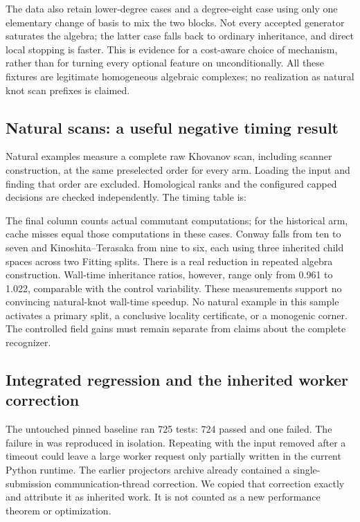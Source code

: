 The data also retain lower-degree cases and a degree-eight case using only
one elementary change of basis to mix the two blocks. Not every accepted generator saturates the algebra; the latter case
falls back to ordinary inheritance, and direct local stopping is faster.
This is evidence for a cost-aware choice of mechanism, rather than for
turning every optional feature on unconditionally. All these fixtures are
legitimate homogeneous algebraic complexes; no realization as natural knot
scan prefixes is claimed.

\subsection{Natural scans: a useful negative timing result}

Natural examples measure a complete raw Khovanov scan, including scanner
construction, at the same preselected order for every arm. Loading the
input and finding that order are excluded. Homological ranks and the
configured capped decisions are checked independently. The timing table is:



The final column counts actual commutant computations; for the historical
arm, cache misses equal those computations in these cases. Conway falls
from ten to seven and Kinoshita--Terasaka from nine to six, each using three
inherited child spaces across two Fitting splits. There is a real reduction
in repeated algebra construction. Wall-time inheritance ratios, however,
range only from 0.961 to 1.022, comparable with the control variability.
These measurements support no convincing natural-knot wall-time speedup.
No natural example in this sample activates a primary split, a conclusive
locality certificate, or a monogenic corner. The controlled field gains
must remain separate from claims about the complete recognizer.

\subsection{Integrated regression and the inherited worker correction}

The untouched pinned baseline ran 725 tests: 724 passed and one failed.
The failure in  was
reproduced in isolation. Repeating  with the input
removed after a timeout could leave a large worker request only partially
written in the current Python runtime. The earlier projectors archive
already contained a single-submission communication-thread correction.
We copied that correction exactly and attribute it as inherited work.
It is not counted as a new performance theorem or optimization.

